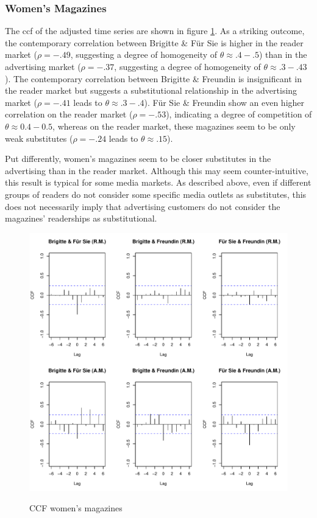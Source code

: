 \documentclass[12pt,a4paper,notitlepage]{article}
\begin{document}
\subsubsection{Women's Magazines}

The ccf of the adjusted time series are shown in figure \ref{fig_ccf_women}. As a striking outcome, the contemporary correlation between Brigitte \& Für Sie is higher in the reader market ($\rho=-.49$, suggesting a degree of homogeneity of $\theta\approx.4-.5$) than in the advertising market ($\rho=-.37$, suggesting a degree of homogeneity of $\theta\approx.3-.43$). The contemporary correlation between Brigitte \& Freundin is insignificant in the reader market but suggests a substitutional relationship in the advertising market ($\rho=-.41$ leads to $\theta\approx.3-.4$). Für Sie \& Freundin show an even higher correlation on the reader market ($\rho=-.53$), indicating a degree of competition of $\theta\approx0.4-0.5$, whereas on the reader market, these magazines seem to be only weak substitutes ($\rho=-.24$ leads to $\theta \approx .15$).

Put differently, women's magazines seem to be closer substitutes in the advertising than in the reader market. Although this may seem counter-intuitive, this result is typical for some media markets. As described above, even if different groups of readers do not consider some specific media outlets as substitutes, this does not necessarily imply that advertising customers do not consider the magazines' readerships as substitutional. 

\begin{figure}[H]
\caption{CCF women's magazines}
	\centering
	\includegraphics[scale=0.5]{../figs/ccf_women}
	\label{fig_ccf_women}
\end{figure}
\end{document}
